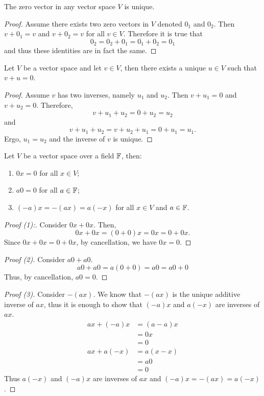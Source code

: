 \begin{proposition}
	The zero vector in any vector space $V$ is unique.
\end{proposition}
\begin{proof}
	Assume there exists two zero vectors in $V$ denoted $0_1$ and $0_2$.
	Then $v+0_1=v$ and $v+0_2=v$ for all $v\in V$.
	Therefore it is true that
	\[
		0_2 = 0_2+0_1 = 0_1 + 0_2 = 0_1
	\]
	and thus these identities are in fact the same.
\end{proof}
\begin{proposition}
	Let $V$ be a vector space and let $v\in V$, then there exists a unique $u\in V$ such that $v+u=0$.
\end{proposition}
\begin{proof}
	Assume $v$ has two inverses, namely $u_1$ and $u_2$.
	Then $v+u_1=0$ and $v+u_2=0$.
	Therefore,
	\[
		v+u_1+u_2=0+u_2=u_2
	\]
	and
	\[
		v+u_1+u_2=v+u_2+u_1=0+u_1=u_1.
	\]
	Ergo, $u_1=u_2$ and the inverse of $v$ is unique.
\end{proof}
\begin{proposition}
	Let $V$ be a vector space over a field $\mathbb{F}$, then:
	\begin{enumerate}
		\item $0x=0$ for all $x\in V$;
		\item $a0 = 0$ for all $a\in\mathbb{F}$;
		\item $(-a)x=-(ax)=a(-x)$ for all $x\in V$ and $a\in\mathbb{F}$.
	\end{enumerate}
\end{proposition}
\begin{proof}[Proof (1):]
	Consider $0x+0x$.
	Then,
	\[
		0x+0x=(0+0)x=0x=0+0x.
	\]
	Since $0x+0x=0+0x$, by cancellation, we have $0x=0$.
\end{proof}
\begin{proof}[Proof (2)]
	Consider $a0+a0$.
	\[
		a0+a0=a(0+0)=a0=a0+0
	\]
	Thus, by cancellation, $a0=0$.
\end{proof}
\begin{proof}[Proof (3)]
	Consider $-(ax)$.
	We know that $-(ax)$ is the unique additive inverse of $ax$, thus it is enough to show that $(-a)x$ and $a(-x)$ are inverses of $ax$.
	\begin{align*}
		ax+(-a)x &= (a-a)x\\
		&= 0x\\
		&= 0\\
		ax+a(-x)&= a(x-x)\\
		&=a0\\
		&=0
	\end{align*}
	Thus $a(-x)$ and $(-a)x$ are inverses of $ax$ and $(-a)x=-(ax)=a(-x)$.
\end{proof}

